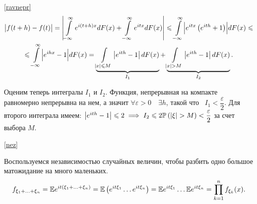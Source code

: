 \documentclass[../TV&MS.tex]{subfiles}
\begin{document}
\begin{Proof} \eqref{ravnepr}
\begin{multline*}
    \bigl| f(t + h) - f(t) \bigr| = 
    \left| \int\limits_{-\infty}^{\infty} e^{i(t+h)x}dF(x) + 
    \int\limits_{-\infty}^{\infty} e^{itx}dF(x) \right| \leqslant
    \int\limits_{-\infty}^{\infty} \Bigl| e^{itx} \left( e^{ith} + 1 \right)  
    \Bigr| dF(x) \leqslant \\ \leqslant \int\limits_{-\infty}^{\infty} \Bigl| e^{ihx} 
    - 1 \Bigr| dF(x) = \underbrace{\int\limits_{|x| \leqslant M}^{} \left| e^{ith} 
    - 1 \right| dF(x)}_{I_1} + \underbrace{\int\limits_{|x| > M}^{} \left| e^{ith}
    - 1 \right|dF(x)}_{I_2}.
\end{multline*}

	Оценим теперь интегралы $I_1$ и $I_2$. Функция, непрерывная на компакте равномерно 
	непрерывна на нем, а значит $\forall \varepsilon > 0 \quad \exists h$, такой что \
	$I_1 < \dfrac{\varepsilon}{2}$. Для второго интеграла имеем: 
	$ \left| e^{ith} - 1 \right|\leqslant 2 \implies I_2 \leqslant 2\mathbb{P} \left( \left| 
	\xi \right| > M \right) < \dfrac{\varepsilon}{2}$ за счет выбора $M$.
\end{Proof} 

\begin{Proof} \eqref{nez}

	Воспользуемся независимостью случайных величин, чтобы разбить одно большое 
	матожидание на много маленьких.
    $$
        f_{\xi_1 +  \ldots + \xi_n} =
        \mathbb{E} e^{it(\xi_1 + \ldots + \xi_n)} = 
        \mathbb{E} \left( e^{it\xi_1} \ldots e^{it\xi_n} \right) =
        \mathbb{E} e^{it\xi_1}  \ldots \mathbb{E} e^{it\xi_n} =
        \prod\limits_{k=1}^{n} f_{\xi_k}(x).
    $$ 
\end{Proof} 
\end{document}
